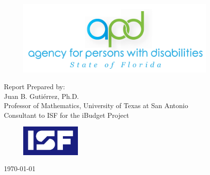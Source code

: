\thispagestyle{empty}
\begin{center}
	{\Large \textbf{\sc{\TheTitle}} } 




	\begin{figure}[th]
		\centering
		\includegraphics[width=10cm]{../assets/APD-logo-BG.png}
	\end{figure}

	\vspace{4cm}
	{\centering Report Prepared by:  
	\\ Juan B. Gutiérrez, Ph.D.
	\\ Professor of Mathematics, University of Texas at San Antonio
	\\ Consultant to ISF for the iBudget Project}
	\vspace{\fill}

	\begin{figure}[th]
		\centering
		\includegraphics[width=3cm]{../assets/ISF-logo-medium.png}
	\end{figure}


	{\Large \textbf{\sc{\TheAuthor}}}

	{\normalsize \today}


	

\end{center}

\newpage
\thispagestyle{empty}

